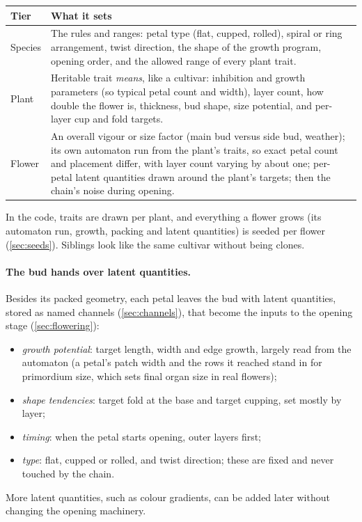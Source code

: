 \begin{center}\small
\begin{tabularx}{\linewidth}{@{}l X@{}}
\toprule
Tier & What it sets \\
\midrule
Species & The rules and ranges: petal type (flat, cupped, rolled), spiral or
  ring arrangement, twist direction, the shape of the growth program, opening
  order, and the allowed range of every plant trait. \\
Plant & Heritable trait \emph{means}, like a cultivar: inhibition and growth
  parameters (so typical petal count and width), layer count, how double the
  flower is, thickness, bud shape, size potential, and per-layer cup and fold
  targets. \\
Flower & An overall vigour or size factor (main bud versus side bud,
  weather); its own automaton run from the plant's traits, so exact petal count
  and placement differ, with layer count varying by about one; per-petal latent
  quantities drawn around the plant's targets; then the chain's noise during
  opening. \\
\bottomrule
\end{tabularx}
\end{center}

In the code, traits are drawn per plant, and everything a flower grows (its
automaton run, growth, packing and latent quantities) is seeded per flower
(\cref{sec:seeds}). Siblings look like the same cultivar without being clones.

\paragraph{The bud hands over latent quantities.} Besides its packed geometry,
each petal leaves the bud with latent quantities, stored as named channels
(\cref{sec:channels}), that become the inputs to the opening stage
(\cref{sec:flowering}):
\begin{itemize}[leftmargin=*]
\item \emph{growth potential}: target length, width and edge growth, largely
  read from the automaton (a petal's patch width and the rows it reached stand
  in for primordium size, which sets final organ size in real flowers);
\item \emph{shape tendencies}: target fold at the base and target cupping,
  set mostly by layer;
\item \emph{timing}: when the petal starts opening, outer layers first;
\item \emph{type}: flat, cupped or rolled, and twist direction; these are
  fixed and never touched by the chain.
\end{itemize}
More latent quantities, such as colour gradients, can be added later without
changing the opening machinery.

